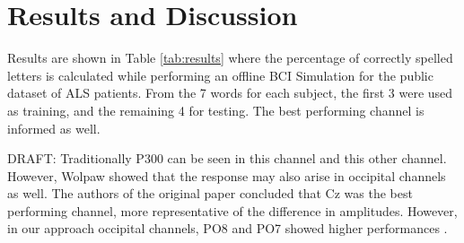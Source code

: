 \documentclass[entropy,article,submit,moreauthors,pdftex,10pt,a4paper]{mdpi}
\begin{document}
\section{Results and Discussion} \label{Results}
\label{section:results}

%

Results are shown in Table \ref{tab:results} where the percentage of correctly spelled letters is calculated while performing an offline BCI Simulation for the public dataset of ALS patients.  From the 7 words for each subject, the first 3 were used as training, and the remaining 4 for testing.  The best performing channel is informed as well.  

DRAFT: Traditionally P300 can be seen in this channel and this other channel.  However, Wolpaw showed that the response may also arise in occipital channels as well.  The authors of the original paper concluded that Cz was the best performing channel, more representative of the difference in amplitudes. However, in our approach occipital channels,  PO8 and PO7 showed higher performances \citep{Huggins2016,Jure2016}.
\end{document}
